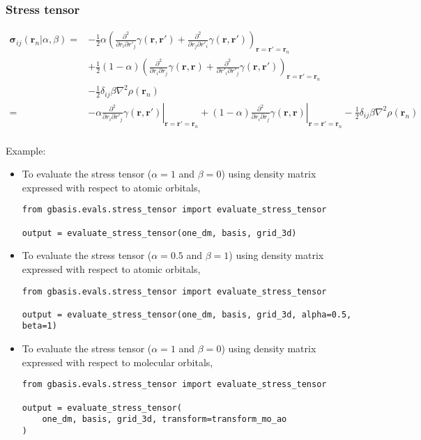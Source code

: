 \documentclass[letterpaper]{article}
\begin{document}
\subsubsection{Stress tensor}
\begin{equation}
  \begin{split}
    \boldsymbol{\sigma}_{ij}(\mathbf{r}_n | \alpha, \beta)
    =&
    -\frac{1}{2} \alpha
    \left(
      \frac{\partial^2}{\partial r_i \partial r'_j} \gamma(\mathbf{r}, \mathbf{r}')
      + \frac{\partial^2}{\partial r_j \partial r'_i} \gamma(\mathbf{r}, \mathbf{r}')
    \right)_{\mathbf{r} = \mathbf{r}' = \mathbf{r}_n}\\
    & +\frac{1}{2} (1 - \alpha)
    \left(
      \frac{\partial^2}{\partial r_i \partial r_j} \gamma(\mathbf{r}, \mathbf{r})
      + \frac{\partial^2}{\partial r'_i \partial r'_j} \gamma(\mathbf{r}, \mathbf{r}')
    \right)_{\mathbf{r} = \mathbf{r}' = \mathbf{r}_n}\\
    & - \frac{1}{2} \delta_{ij} \beta \nabla^2 \rho(\mathbf{r}_n)\\
    =&
    - \alpha
    \left.
      \frac{\partial^2}{\partial r_i \partial r'_j} \gamma(\mathbf{r}, \mathbf{r}')
    \right|_{\mathbf{r} = \mathbf{r}' = \mathbf{r}_n}
    + (1 - \alpha)
    \left.
      \frac{\partial^2}{\partial r_i \partial r_j} \gamma(\mathbf{r}, \mathbf{r})
    \right|_{\mathbf{r} = \mathbf{r}' = \mathbf{r}_n}
    - \frac{1}{2} \delta_{ij} \beta \nabla^2 \rho(\mathbf{r}_n)\\
  \end{split}
\end{equation}

Example:
\begin{itemize}
\item To evaluate the stress tensor ($\alpha=1$ and $\beta=0$)
  using density matrix expressed with respect to atomic orbitals,
  \begin{lstlisting}[xleftmargin=-25pt]
from gbasis.evals.stress_tensor import evaluate_stress_tensor

output = evaluate_stress_tensor(one_dm, basis, grid_3d)
\end{lstlisting}
\item To evaluate the stress tensor ($\alpha=0.5$ and $\beta=1$)
  using density matrix expressed with respect to atomic orbitals,
  \begin{lstlisting}[xleftmargin=-25pt]
from gbasis.evals.stress_tensor import evaluate_stress_tensor

output = evaluate_stress_tensor(one_dm, basis, grid_3d, alpha=0.5, beta=1)
\end{lstlisting}
\item To evaluate the stress tensor ($\alpha=1$ and $\beta=0$)
  using density matrix expressed with respect to molecular orbitals,
  \begin{lstlisting}[xleftmargin=-25pt]
from gbasis.evals.stress_tensor import evaluate_stress_tensor

output = evaluate_stress_tensor(
    one_dm, basis, grid_3d, transform=transform_mo_ao
)
\end{lstlisting}
\end{itemize}
\end{document}
